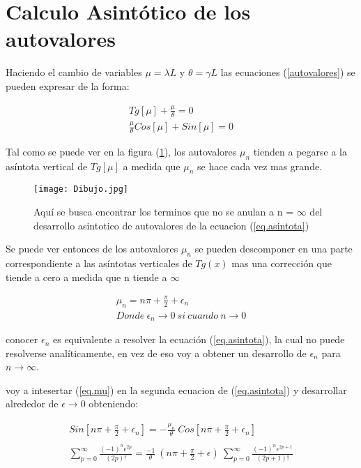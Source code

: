 \section{Calculo Asintótico de los autovalores}


Haciendo el cambio de variables $\mu = \lambda L$ y $\theta = \gamma L $ las ecuaciones (\ref{autovalores}) se pueden expresar de la forma:

\begin{equation}
\begin{array}{c}
    Tg[\mu] + \frac{\mu}{\theta} = 0 \\
    \frac{\mu}{\theta} Cos[\mu] + Sin[\mu] = 0
\end{array}
\label{eq.asintota}
\end{equation}

Tal como se puede ver en la figura (\ref{fig:Dibujo}), los autovalores $\mu _n$ tienden a pegarse a la asíntota vertical de $ Tg [ \mu ] $ a medida que $\mu _n$ se hace cada vez mas grande.

\begin{figure}
    \centering
    \texttt{[image: Dibujo.jpg]}
    \caption{Aquí se busca encontrar los terminos que no se anulan a n = $\infty$ del desarrollo asintotico de autovalores de la ecuacion (\ref{eq.asintota}) }
    \label{fig:Dibujo}
\end{figure}

Se puede ver entonces de los autovalores $\mu _n$ se pueden descomponer en una parte correspondiente a las asíntotas verticales de $Tg(x)$ mas una corrección que tiende a cero a medida que n tiende a $\infty$

\begin{equation}
\begin{array}{c}
    \mu _n = n \pi + \frac{\pi}{2} + \epsilon _n \\
    Donde \ \epsilon _n \rightarrow{0} \ si \ cuando \ n \rightarrow{0}
\end{array}
\label{eq.mu}
\end{equation}


conocer $\epsilon _n $ es equivalente a resolver la ecuación (\ref{eq.asintota}), la cual no puede resolverse analíticamente, en vez de eso voy a obtener un desarrollo de $\epsilon _n $ para $n \rightarrow \infty$.

voy a intesertar (\ref{eq.mu}) en la segunda ecuacion de (\ref{eq.asintota}) y desarrollar alrededor de $\epsilon \rightarrow{0}$ obteniendo:

\begin{equation}
\begin{array}{c}
    Sin[ n \pi + \frac{\pi}{2} + \epsilon _n ] = 
    - \frac{\mu _n}{\theta}  \ Cos[ n \pi + \frac{\pi}{2} + \epsilon _n ]  \\
 \\

         \sum _{p=0} ^{\infty} \frac{(-1) ^n  \epsilon ^{2 p }}{(2p)!} 
    =  \frac{-1}{\theta}  \ (n \pi + \frac{\pi}{2} + \epsilon ) \
     \sum _{p=0} ^{\infty} \frac{(-1) ^n \epsilon ^{2 p + 1}}{(2p+1)!} 
\end{array}
\end{equation}


